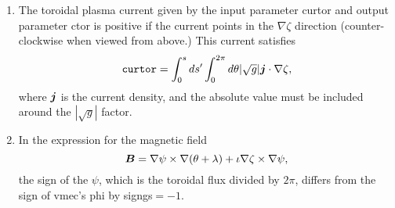 \documentclass[11pt,letter]{article}
\newcommand{\vect}[1]{\mbox{\boldmath $#1$}}
\begin{document}
\begin{enumerate}
\item
The toroidal plasma current given by the input parameter {\ttfamily curtor} and output parameter {\ttfamily ctor} is positive if the current points in the $\nabla\zeta$ direction
(counter-clockwise when viewed from above.) This current satisfies
\begin{equation}
\mathtt{curtor} = \int_0^s ds' \int_0^{2\pi} d\theta | \sqrt{g}| \vect{j}\cdot\nabla\zeta,
\end{equation}
where $\vect{j}$ is the current density, and the absolute value must be included around the $| \sqrt{g}|$ factor.
\item
In the expression for the magnetic field
\begin{equation}
\vect{B} = \nabla\psi\times\nabla(\theta + \lambda) + \iota \nabla\zeta\times\nabla\psi,
\end{equation}
the sign of the $\psi$, which is the toroidal flux divided by $2\pi$, differs from the sign of vmec's {\ttfamily phi}
by {\ttfamily signgs}$=-1$.
\end{enumerate}

\begin{comment}
\section{Evidence}
Line 273 of {\ttfamily General/bcovar.f: \\
\\
ctor = signgs*twopi*(c1p5*buco(ns) - p5*buco(ns1))
\\
}
where {\ttfamily p5}=0.5 and {\ttfamily c1p5}=1.5.
\end{comment}


%
\end{document}
